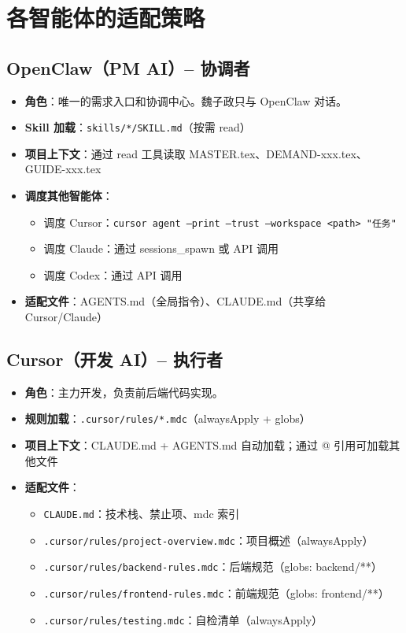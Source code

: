 \documentclass[11pt,a4paper]{article}
\begin{document}
\section{各智能体的适配策略}

\subsection{OpenClaw（PM AI）-- 协调者}

\begin{itemize}[nosep]
  \item \textbf{角色}：唯一的需求入口和协调中心。魏子政只与 OpenClaw 对话。
  \item \textbf{Skill 加载}：\texttt{skills/*/SKILL.md}（按需 read）
  \item \textbf{项目上下文}：通过 read 工具读取 MASTER.tex、DEMAND-xxx.tex、GUIDE-xxx.tex
  \item \textbf{调度其他智能体}：
    \begin{itemize}[nosep]
      \item 调度 Cursor：\texttt{cursor agent --print --trust --workspace <path> "任务"}
      \item 调度 Claude：通过 sessions\_spawn 或 API 调用
      \item 调度 Codex：通过 API 调用
    \end{itemize}
  \item \textbf{适配文件}：AGENTS.md（全局指令）、CLAUDE.md（共享给 Cursor/Claude）
\end{itemize}

\subsection{Cursor（开发 AI）-- 执行者}

\begin{itemize}[nosep]
  \item \textbf{角色}：主力开发，负责前后端代码实现。
  \item \textbf{规则加载}：\texttt{.cursor/rules/*.mdc}（alwaysApply + globs）
  \item \textbf{项目上下文}：CLAUDE.md + AGENTS.md 自动加载；通过 @ 引用可加载其他文件
  \item \textbf{适配文件}：
    \begin{itemize}[nosep]
      \item \texttt{CLAUDE.md}：技术栈、禁止项、mdc 索引
      \item \texttt{.cursor/rules/project-overview.mdc}：项目概述（alwaysApply）
      \item \texttt{.cursor/rules/backend-rules.mdc}：后端规范（globs: backend/**）
      \item \texttt{.cursor/rules/frontend-rules.mdc}：前端规范（globs: frontend/**）
      \item \texttt{.cursor/rules/testing.mdc}：自检清单（alwaysApply）
    \end{itemize}
\end{itemize}
\end{document}

